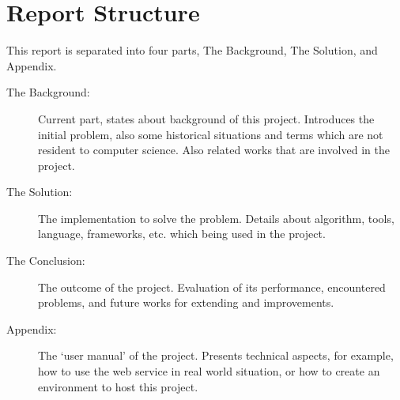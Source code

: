 \section{Report Structure}

This report is separated into four parts, The Background, The Solution,
and Appendix.

\begin{description}
\item[The Background:]
  Current part, states about background of this project. Introduces
  the initial problem, also some historical situations and terms
  which are not resident to computer science. Also related works
  that are involved in the project.
\item[The Solution:]
  The implementation to solve the problem. Details about algorithm,
  tools, language, frameworks, etc. which being used in the project.
\item[The Conclusion:]
  The outcome of the project. Evaluation of its performance,
  encountered problems, and future works for extending and improvements.
\item[Appendix:]
  The `user manual' of the project. Presents technical aspects,
  for example, how to use the web service in real world situation,
  or how to create an environment to host this project.
\end{description}
